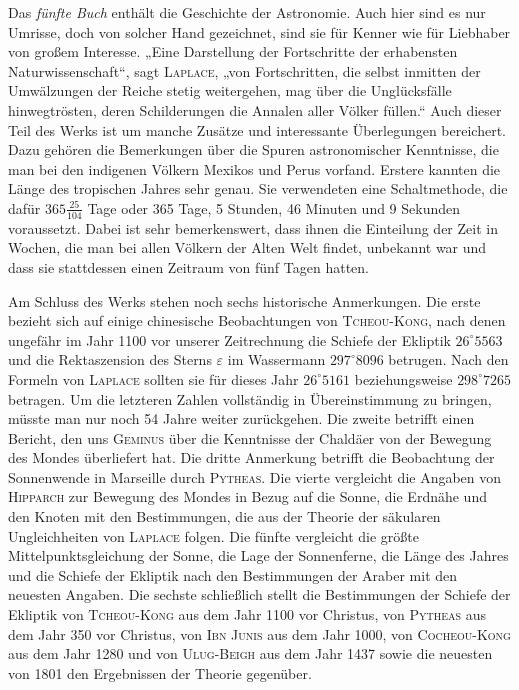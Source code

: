 Das \emph{fünfte Buch} enthält die Geschichte der Astronomie. Auch hier sind es nur Umrisse, doch von solcher Hand gezeichnet, sind sie für Kenner wie für Liebhaber von großem Interesse. „Eine Darstellung der Fortschritte der erhabensten Naturwissenschaft“, sagt \textsc{Laplace}, „von Fortschritten, die selbst inmitten der Umwälzungen der Reiche stetig weitergehen, mag über die Unglücksfälle hinwegtrösten, deren Schilderungen die Annalen aller Völker füllen.“ Auch dieser Teil des Werks ist um manche Zusätze und interessante Überlegungen bereichert. Dazu gehören die Bemerkungen über die Spuren astronomischer Kenntnisse, die man bei den indigenen Völkern Mexikos und Perus vorfand. Erstere kannten die Länge des tropischen Jahres sehr genau. Sie verwendeten eine Schaltmethode, die dafür $365\frac{25}{104}$ Tage oder 365 Tage, 5 Stunden, 46 Minuten und 9 Sekunden voraussetzt. Dabei ist sehr bemerkenswert, dass ihnen die Einteilung der Zeit in Wochen, die man bei allen Völkern der Alten Welt findet, unbekannt war und dass sie stattdessen einen Zeitraum von fünf Tagen hatten.

Am Schluss des Werks stehen noch sechs historische Anmerkungen. Die erste bezieht sich auf einige chinesische Beobachtungen von \textsc{Tcheou-Kong}, nach denen ungefähr im Jahr 1100 vor unserer Zeitrechnung die Schiefe der Ekliptik $26^{\circ}5563$ und die Rektaszension des Sterns $\varepsilon$ im Wassermann $297^{\circ}8096$ betrugen. Nach den Formeln von \textsc{Laplace} sollten sie für dieses Jahr $26^{\circ}5161$ beziehungsweise $298^{\circ}7265$ betragen. Um die letzteren Zahlen vollständig in Übereinstimmung zu bringen, müsste man nur noch 54 Jahre weiter zurückgehen. Die zweite betrifft einen Bericht, den uns \textsc{Geminus} über die Kenntnisse der Chaldäer von der Bewegung des Mondes überliefert hat. Die dritte Anmerkung betrifft die Beobachtung der Sonnenwende in Marseille durch \textsc{Pytheas}. Die vierte vergleicht die Angaben von \textsc{Hipparch} zur Bewegung des Mondes in Bezug auf die Sonne, die Erdnähe und den Knoten mit den Bestimmungen, die aus der Theorie der säkularen Ungleichheiten von \textsc{Laplace} folgen. Die fünfte vergleicht die größte Mittelpunktsgleichung der Sonne, die Lage der Sonnenferne, die Länge des Jahres und die Schiefe der Ekliptik nach den Bestimmungen der Araber mit den neuesten Angaben. Die sechste schließlich stellt die Bestimmungen der Schiefe der Ekliptik von \textsc{Tcheou-Kong} aus dem Jahr 1100 vor Christus, von \textsc{Pytheas} aus dem Jahr 350 vor Christus, von \textsc{Ibn Junis} aus dem Jahr 1000, von \textsc{Cocheou-Kong} aus dem Jahr 1280 und von \textsc{Ulug-Beigh} aus dem Jahr 1437 sowie die neuesten von 1801 den Ergebnissen der Theorie gegenüber.
